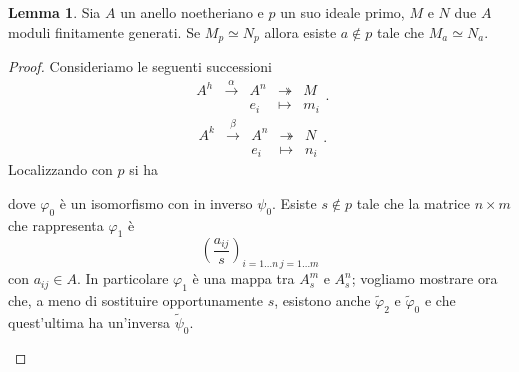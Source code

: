 \documentclass[a4paper,11pt,oneside]{book}
\theoremstyle{definition}
\newtheorem{lemma}{Lemma}
\begin{document}
 \begin{lemma}\label{lemma:3implica4}
  Sia $A$ un anello noetheriano e $p$ un suo ideale primo, $M$ e $N$ due $A$ moduli finitamente generati. Se
  $M_p\simeq N_p$ allora esiste $a\notin p$ tale che $M_a\simeq N_a$.
 \end{lemma}
 \begin{proof}
  Consideriamo le seguenti successioni 
  \[\begin{matrix}
   A^h&\xrightarrow{\alpha}& A^n & \twoheadrightarrow& M\\
      & 		    & e_i & \mapsto & m_i
  \end{matrix}.
  \]
  \[\begin{matrix}
   A^k&\xrightarrow{\beta}& A^n & \twoheadrightarrow & N\\
      & 		    & e_i & \mapsto & n_i
  \end{matrix}.
  \]
  Localizzando con $p$ si ha
  \begin{center}
    \end{center}
   dove $\varphi_0$ è un isomorfismo con in inverso $\psi_0$. Esiste $s\notin p$ tale che la matrice $n\times m$ che rappresenta $\varphi_1$ è
    \[
     \left( \frac{a_{ij}}{s} \right)_{ i=1\dots n \, j=1\dots m}
    \]
    con $a_{ij}\in A$. 
    In particolare $\varphi_1$ è una mappa tra $A_s^m$ e $A_s^n$; vogliamo mostrare ora che, a meno di sostituire opportunamente $s$,
    esistono anche $\tilde \varphi_2$ e $\tilde \varphi_0$ e che quest'ultima ha un'inversa $\tilde\psi_0$.
    \begin{center}
\end{center}
\end{proof}
\end{document}
